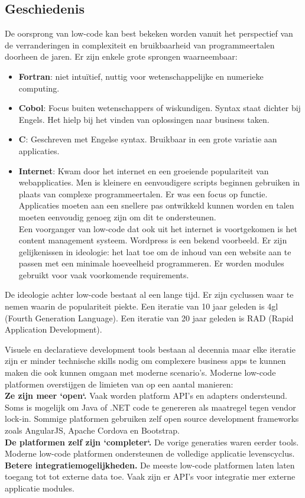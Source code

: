 \subsection{Geschiedenis}

De oorsprong van low-code kan best bekeken worden vanuit het perspectief van de verranderingen in complexiteit en bruikbaarheid van programmeertalen doorheen de jaren. Er zijn enkele grote sprongen waarneembaar:
\begin{itemize}
    \item \textbf{Fortran}: niet intuïtief, nuttig voor wetenschappelijke en numerieke computing.
    \item \textbf{Cobol}: Focus buiten wetenschappers of wiskundigen. Syntax staat dichter bij Engels. Het hielp bij het vinden van oplossingen naar business taken.
    \item \textbf{C}: Geschreven met Engelse syntax. Bruikbaar in een grote variatie aan applicaties.
    \item \textbf{Internet}: Kwam door het internet en een groeiende populariteit van webapplicaties. Men is kleinere en eenvoudigere scripts beginnen gebruiken in plaats van complexe programmeertalen. Er was een focus op functie. Applicaties moeten aan een snellere pas ontwikkeld kunnen worden en talen moeten eenvoudig genoeg zijn om dit te ondersteunen.\\
    Een voorganger van low-code dat ook uit het internet is voortgekomen is het content management systeem. Wordpress is een bekend voorbeeld. Er zijn gelijkenissen in ideologie: het laat toe om de inhoud van een website aan te passen met een minimale hoeveelheid programmeren. Er worden modules gebruikt voor vaak voorkomende requirements. \autocite{Kissflow2018}
\end{itemize} \autocite{Kissflow2018a}

De ideologie achter low-code bestaat al een lange tijd. Er zijn cyclussen waar te nemen waarin de populariteit piekte. Een iteratie van 10 jaar geleden is 4gl (Fourth Generation Language). Een iteratie van 20 jaar geleden is RAD (Rapid Application Development). %

Visuele en declaratieve development tools bestaan al decennia maar elke iteratie zijn er minder technische skills nodig om complexere business apps te kunnen maken die ook kunnen omgaan met moderne scenario's. Moderne low-code platformen overstijgen de limieten van op een aantal manieren: \\
\textbf{Ze zijn meer `open`.} Vaak worden platform API's en adapters ondersteund. Soms is mogelijk om Java of .NET code te genereren als maatregel tegen vendor lock-in. Sommige platformen gebruiken zelf open source development frameworks zoals AngularJS, Apache Cordova en Bootstrap.\\
\textbf{De platformen zelf zijn `completer`.} De vorige generaties waren eerder tools. Moderne low-code platformen ondersteunen de volledige applicatie levenscyclus.\\
\textbf{Betere integratiemogelijkheden.} De meeste low-code platformen laten laten toegang tot tot externe data toe. Vaak zijn er API's voor integratie mer externe applicatie modules. 

